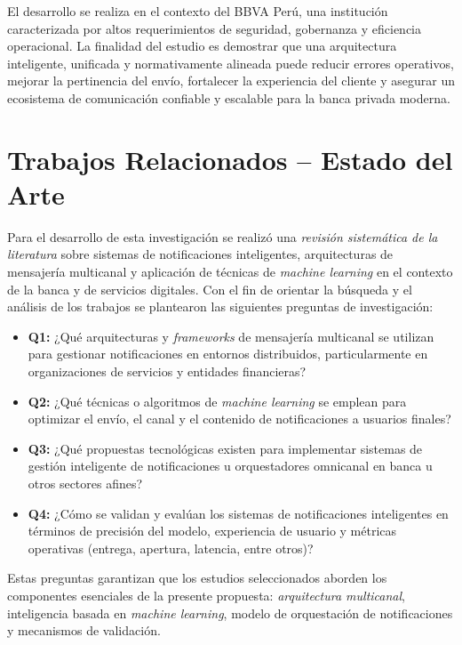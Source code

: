 \documentclass[conference]{IEEEtran}
\begin{document}
El desarrollo se realiza en el contexto del BBVA Perú, una institución caracterizada por altos requerimientos de seguridad, gobernanza y eficiencia operacional. La finalidad del estudio es demostrar que una arquitectura inteligente, unificada y normativamente alineada puede reducir errores operativos, mejorar la pertinencia del envío, fortalecer la experiencia del cliente y asegurar un ecosistema de comunicación confiable y escalable para la banca privada moderna.




\section{Trabajos Relacionados – Estado del Arte}
Para el desarrollo de esta investigación se realizó una \textit{revisión sistemática de la literatura} sobre sistemas de notificaciones inteligentes, arquitecturas de mensajería multicanal y aplicación de técnicas de \textit{machine learning} en el contexto de la banca y de servicios digitales. Con el fin de orientar la búsqueda y el análisis de los trabajos se plantearon las siguientes preguntas de investigación:

\begin{itemize}
  \item \textbf{Q1:} ¿Qué arquitecturas y \textit{frameworks} de mensajería multicanal se utilizan para gestionar notificaciones en entornos distribuidos, particularmente en organizaciones de servicios y entidades financieras?
  \item \textbf{Q2:} ¿Qué técnicas o algoritmos de \textit{machine learning} se emplean para optimizar el envío, el canal y el contenido de notificaciones a usuarios finales?
  \item \textbf{Q3:} ¿Qué propuestas tecnológicas existen para implementar sistemas de gestión inteligente de notificaciones u orquestadores omnicanal en banca u otros sectores afines?
  \item \textbf{Q4:} ¿Cómo se validan y evalúan los sistemas de notificaciones inteligentes en términos de precisión del modelo, experiencia de usuario y métricas operativas (entrega, apertura, latencia, entre otros)?
\end{itemize}

Estas preguntas garantizan que los estudios seleccionados aborden los componentes esenciales de la presente propuesta: \textit{arquitectura multicanal}, inteligencia basada en \textit{machine learning}, modelo de orquestación de notificaciones y mecanismos de validación.
\end{document}
